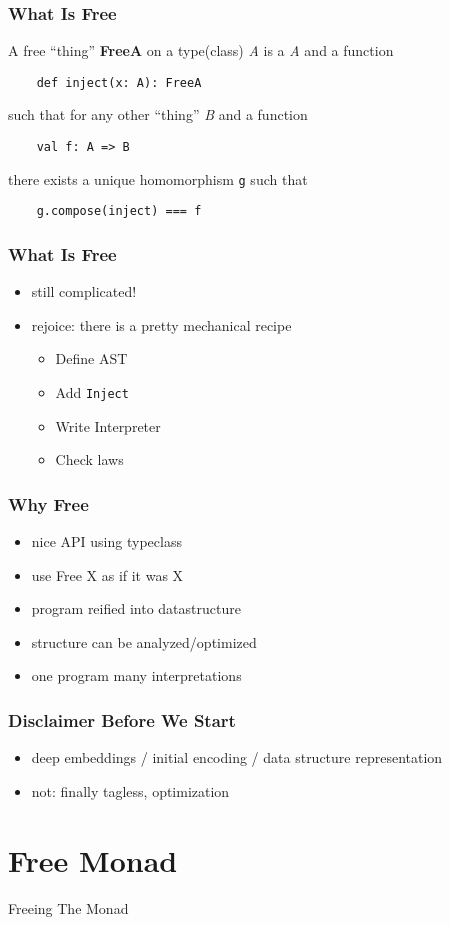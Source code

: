 \documentclass{beamer}
\newcommand{\recipe}{%
  \begin{itemize}
  \item Define AST
  \item Add \texttt{Inject}
  \item Write Interpreter
  \item Check laws
  \end{itemize}
}
\begin{document}
\begin{frame}[fragile]
  \frametitle{What Is Free} A free ``thing'' \textbf{FreeA} on a type(class)
  \textit{A} is a \textit{A} and a function
  \begin{verbatim}
    def inject(x: A): FreeA
  \end{verbatim}
  such that for any other ``thing'' \textit{B} and a function
  \begin{verbatim}
    val f: A => B
  \end{verbatim}
  there exists a unique homomorphism \texttt{g} such that
  \begin{verbatim}
    g.compose(inject) === f
  \end{verbatim}
\end{frame}

\begin{frame}[fragile]
  \frametitle{What Is Free}
  \begin{itemize}
  \item still complicated!
  \item rejoice: there is a pretty mechanical recipe
    \recipe{}
  \end{itemize}
\end{frame}

\begin{frame}
  \frametitle{Why Free}
  \begin{itemize}
  \item nice API using typeclass
  \item use Free X as if it was X
  \item program reified into datastructure
  \item structure can be analyzed/optimized
  \item one program \textemdash{} many interpretations
  \end{itemize}
\end{frame}

\begin{frame}
  \frametitle{Disclaimer Before We Start}
  \begin{itemize}
  \item deep embeddings / initial encoding / data structure representation
  \item not: finally tagless, optimization
  \end{itemize}
\end{frame}

\section{Free Monad}\label{sec:free-monad}
\begin{frame}
  \begin{center}
    \Huge
    Freeing The Monad
  \end{center}
\end{frame}
\end{document}
